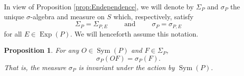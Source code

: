 \documentclass[11pt]{article}
\newtheorem{proposition}[theorem]{Proposition}
\theoremstyle{remark}
\newcommand\Sym{\operatorname{Sym}}
\newcommand\Exp{\operatorname{Exp}}
\begin{document}
\noindent In view of Proposition \ref{prop:Endependence}, we will denote by $\Sigma_P$ and $\sigma_P$ the unique $\sigma$-algebra and measure on $S$ which, respectively, satisfy
\begin{equation*}
    \Sigma_P=\Sigma_{P,E}\hspace{1cm}\mbox{and}\hspace{1cm}\sigma_P=\sigma_{P,E}
\end{equation*}
for all $E\in\Exp(P)$. We will henceforth assume this notation. 



\begin{proposition}\label{prop:SymInvariance}
For any $O\in\Sym(P)$ and $F\in\Sigma_P$,
\begin{equation*}
\sigma_P(O F)=\sigma_P(F).
\end{equation*} 
That is, the measure $\sigma_P$ is invariant under the action by $\Sym(P)$. 
\end{proposition}
\end{document}
